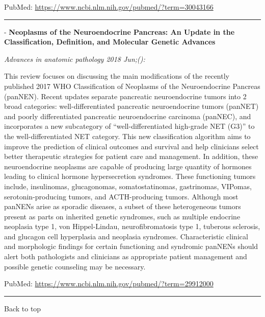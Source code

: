 \documentclass[]{article}
\begin{document}
PubMed: \url{https://www.ncbi.nlm.nih.gov/pubmed/?term=30043166}

{}

{}

\begin{center}\rule{0.5\linewidth}{\linethickness}\end{center}

 - \textbf{Neoplasms of the Neuroendocrine Pancreas: An Update in the
Classification, Definition, and Molecular Genetic Advances}

\emph{Advances in anatomic pathology 2018 Jun;():}

This review focuses on discussing the main modifications of the recently
published 2017 WHO Classification of Neoplasms of the Neuroendocrine
Pancreas (panNEN). Recent updates separate pancreatic neuroendocrine
tumors into 2 broad categories: well-differentiated pancreatic
neuroendocrine tumors (panNET) and poorly differentiated pancreatic
neuroendocrine carcinoma (panNEC), and incorporates a new subcategory of
``well-differentiated high-grade NET (G3)'' to the well-differentiated
NET category. This new classification algorithm aims to improve the
prediction of clinical outcomes and survival and help clinicians select
better therapeutic strategies for patient care and management. In
addition, these neuroendocrine neoplasms are capable of producing large
quantity of hormones leading to clinical hormone hypersecretion
syndromes. These functioning tumors include, insulinomas, glucagonomas,
somatostatinomas, gastrinomas, VIPomas, serotonin-producing tumors, and
ACTH-producing tumors. Although most panNENs arise as sporadic diseases,
a subset of these heterogeneous tumors present as parts on inherited
genetic syndromes, such as multiple endocrine neoplasia type 1, von
Hippel-Lindau, neurofibromatosis type 1, tuberous sclerosis, and
glucagon cell hyperplasia and neoplasia syndromes. Characteristic
clinical and morphologic findings for certain functioning and syndromic
panNENs should alert both pathologists and clinicians as appropriate
patient management and possible genetic counseling may be necessary.

PubMed: \url{https://www.ncbi.nlm.nih.gov/pubmed/?term=29912000}

{}

{}

\begin{center}\rule{0.5\linewidth}{\linethickness}\end{center}

Back to top
\end{document}
